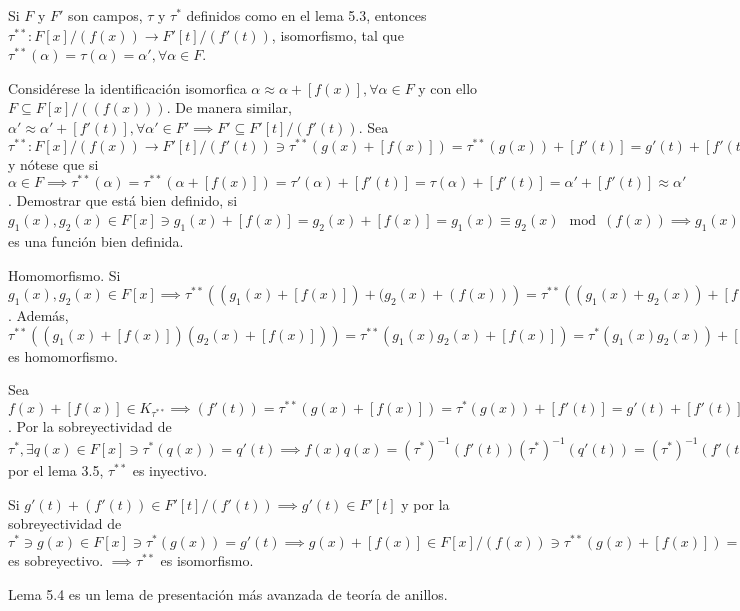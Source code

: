 \begin{lema}[5.4]
    Si $F$ y $F'$ son campos, $\tau$ y $\tau^*$ definidos como en el lema 5.3, entonces $\tau^{**}:F[x]/(f(x))\to F'[t]/(f'(t))$, isomorfismo, tal que $\tau^{**}(\alpha)=\tau(\alpha)=\alpha',\forall \alpha\in F$.
    \begin{dem}
        Considérese la identificación isomorfica $\alpha\approx \alpha+[f(x)],\forall \alpha \in F$ y con ello $F\subseteq F[x]/((f(x)))$. De manera similar, $\alpha'\approx \alpha' + [f'(t)],\forall \alpha' \in F'\implies F'\subseteq F'[t]/(f'(t))$. Sea $\tau^{**}: F[x]/(f(x))\to F'[t]/(f'(t))\ni \tau^{**}(g(x)+[f(x)])=\tau^{**}(g(x))+[f'(t)]=g'(t)+[f'(t)]$ y nótese que si $\alpha\in F\implies \tau^{**}(\alpha)=\tau^{**}(\alpha+[f(x)])=\tau'(\alpha)+[f'(t)]=\tau(\alpha)+[f'(t)]=\alpha' + [f'(t)]\approx \alpha '$.\bigbreak 
        Demostrar que está bien definido, si $g_1(x),g_2(x)\in F[x]\ni g_1(x)+[f(x)] = g_2(x)+[f(x)]=g_1(x)\equiv g_2(x)\mod(f(x))\implies g_1(x)-g_2(x)\in (f(x))\implies f(x)|g_1(x)-g_2(x)\implies\exists q(x)\in F[x]\ni f(x)q(x)=g_1(x)-g_2(x)\implies f'(t)q'(t)=\tau^*(f(x))\tau^*(q(x))=\tau^*(f(x)q(x))=\tau^*(g_1(x)-g_2(x))=\tau^*(g_1(x))-\tau^*(g_2(x))=g_1'(t)-g_2'(t)\implies f'(t)|g_1'(t)-g_2'(t)\implies g_1'(t)-g_2'(t)\in (f(t))\implies g_1'(t)\equiv g_2'(t)\mod(f'(t))\implies \tau^*(g(t)+[f(x)])=\tau^*(g_1(x))+(f'(t))=g_1'(t)+[f'(t)]=g_2'(t)+[f'(t)]=\tau^*(g_2(x))+(f'(t))=\tau^{**}(g_2(x)+f(x))\implies \tau ^{**}$ es una función bien definida. \bigbreak 


        Homomorfismo. Si $g_1(x),g_2(x)\in F[x]\implies\tau^{**}\left((g_1(x)+[f(x)])+(g_2(x)+(f(x))\right)=\tau^{**}\left((g_1(x)+g_2(x))+[f(x)]\right)=\tau^{*}(g_1(x)+g_2(x))+[f'(t)]=\tau^*(g_1(x))+\tau^*(g_2(x))+[f'(t)]=(g_1'(t)+g_2'(t))+[f'(t)]=g'(t)+[f'(t)]+g_2'(t)+[f'(t)]=\tau^*(g_1(x))+[f'(t)]+\tau^*(g_2(x)+[f'(t)])=\tau^{**}(g_1(x)+[f(x)])+\tau^{**}(g_2(x)+(f(x)))$. Además, $\tau^{**}((g_1(x)+[f(x)])(g_2(x)+[f(x)]))=\tau^{**}(g_1(x)g_2(x)+[f(x)])=\tau^*(g_1(x)g_2(x))+[f'(t)]=\tau^{*}(g_1(x))\tau^{*}(g_2(x))+[f'(t)]=\cdots = \tau^{**}(g_1(x)+[f(x)])\tau^{**}(g_2(x)+[f(x)])\implies \tau^{**}$ es homomorfismo. \bigbreak 

        Sea $f(x)+[f(x)]\in K_{\tau^{**}}\implies (f'(t))=\tau^{**}(g(x)+[f(x)])=\tau^*(g(x))+[f'(t)]=g'(t)+[f'(t)]\implies g'(t)\in (f'(t))\implies f'(t)|g'(t)\implies \exists q'(t)\in F'[t]\ni f'(t)q'(t)=g'(t)$. Por la sobreyectividad de $\tau^*,\exists q(x)\in F[x]\ni \tau^*(q(x))=q'(t)\implies f(x)q(x)=(\tau^{*})^{-1}(f'(t))(\tau^{*})^{-1}(q'(t))=(\tau^{*})^{-1}(f'(t)q'(t))=(\tau^{*})^{-1}(g'(t))=g(x)\implies f(x)|g(x)\implies g(x)\in (f(x))\implies g(x)+[f(x)]=[f(x)]\implies K_{\tau^{**}}=(f(x))\implies$ por el lema 3.5, $\tau^{**}$ es inyectivo. \bigbreak 

        Si $g'(t)+(f'(t))\in F'[t]/(f'(t))\implies g'(t)\in F'[t]$ y por la sobreyectividad de $\tau^{*}\ni g(x)\in F[x]\ni \tau^{*}(g(x))=g'(t)\implies g(x)+[f(x)]\in F[x]/(f(x))\ni \tau^{**}(g(x)+[f(x)])=\tau^*(g(x))+(f'(t))=g'(t)+[f'(t)]\implies \tau^{**}$ es sobreyectivo. $\implies \tau^{**}$ es isomorfismo. 
    \end{dem}
\end{lema}

\begin{cajita}
    Lema 5.4 es un lema de presentación más avanzada de teoría de anillos. 
\end{cajita}

